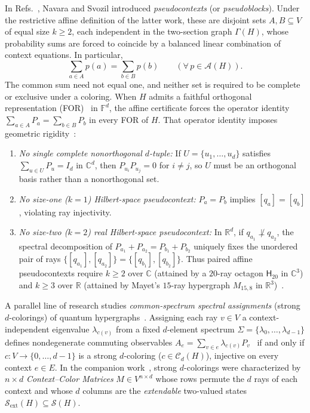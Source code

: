 \documentclass[aps,pra,reprint,superscriptaddress,longbibliography,nofootinbib,floatfix,10pt]{revtex4-2}
\theoremstyle{definition}\newtheorem{definition}[theorem]{Definition}
\theoremstyle{remark}\newtheorem{remark}[theorem]{Remark}
\newcommand{\C}{\mathbb C}\newcommand{\R}{\mathbb R}\newcommand{\Q}{\mathbb Q}
\newcommand{\F}{\mathbb F}\newcommand{\Z}{\mathbb Z}\newcommand{\PP}{\mathbb P}
\newcommand{\Sc}{\mathcal S}\newcommand{\Cc}{\mathcal C}\newcommand{\Wc}{\mathcal W}
\newcommand{\Htwenty}{\mathsf H_{20}}
\begin{document}
In Refs.~\cite{2023-navara-svozil,2026-Navara-Svozil-pseudocontexts}, Navara and Svozil introduced \emph{pseudocontexts} (or \emph{pseudoblocks}). Under the restrictive affine definition of the latter work, these are disjoint sets $A,B\subseteq V$ of equal size $k\ge2$, each independent in the two-section graph $\Gamma(H)$, whose probability sums are forced to coincide by a balanced linear combination of context equations. In particular,
\begin{equation}\label{eq:paired-sum}
\sum_{a\in A} p(a) = \sum_{b\in B} p(b) \qquad (\forall\, p\in\mathcal A(H)).
\end{equation}
The common sum need not equal one, and neither set is required to be complete or exclusive under a coloring. When $H$ admits a faithful orthogonal representation (FOR)~\cite{lovasz-79,Portillo-2015} in $\F^d$, the affine certificate forces the operator identity $\sum_{a\in A}P_a=\sum_{b\in B}P_b$ in every FOR of $H$. That operator identity imposes geometric rigidity~\cite{2026-Navara-Svozil-pseudocontexts,2026-Navara-Svozil-complex-only-3d-hypergraphs}:
\begin{enumerate}
\item \emph{No single complete nonorthogonal $d$-tuple:} If $U=\{u_1,\ldots,u_d\}$ satisfies $\sum_{u\in U}P_u=I_d$ in $\C^d$, then $P_{u_i}P_{u_j}=0$ for $i\neq j$, so $U$ must be an orthogonal basis rather than a nonorthogonal set.
\item \emph{No size-one ($k=1$) Hilbert-space pseudocontext:} $P_a=P_b$ implies $[q_a]=[q_b]$, violating ray injectivity.
\item \emph{No size-two ($k=2$) real Hilbert-space pseudocontext:} In $\R^d$, if $q_{a_1}\not\perp q_{a_2}$, the spectral decomposition of $P_{a_1}+P_{a_2}=P_{b_1}+P_{b_2}$ uniquely fixes the unordered pair of rays $\{[q_{a_1}],[q_{a_2}]\}=\{[q_{b_1}],[q_{b_2}]\}$. Thus paired affine pseudocontexts require $k\ge 2$ over $\C$ (attained by a $20$-ray octagon $\Htwenty$ in $\C^3$) and $k\ge 3$ over $\R$ (attained by Mayet's $15$-ray hypergraph $M_{15,8}$ in $\R^3$)~\cite{2026-Navara-Svozil-pseudocontexts}.
\end{enumerate}

A parallel line of research studies \emph{common-spectrum spectral assignments} (strong $d$-colorings) of quantum hypergraphs~\cite{svozil-2020-c,svozil-2021-chroma,svozil2026contexts,2026-latin-context-matrix}. Assigning each ray $v\in V$ a context-independent eigenvalue $\lambda_{c(v)}$ from a fixed $d$-element spectrum $\Sigma=\{\lambda_0,\ldots,\lambda_{d-1}\}$ defines nondegenerate commuting observables $A_e=\sum_{v\in e}\lambda_{c(v)}P_v$~\cite{v-neumann-31,halmos-vs} if and only if $c:V\to\{0,\ldots,d-1\}$ is a strong $d$-coloring ($c\in\Cc_d(H)$), injective on every context $e\in E$. In the companion work~\cite{2026-latin-context-matrix}, strong $d$-colorings were characterized by $n\times d$ \emph{Context--Color Matrices} $M\in V^{n\times d}$ whose rows permute the $d$ rays of each context and whose $d$ columns are the \emph{extendable} two-valued states $\Sc_{\mathrm{ext}}(H)\subseteq\Sc(H)$.
\end{document}
